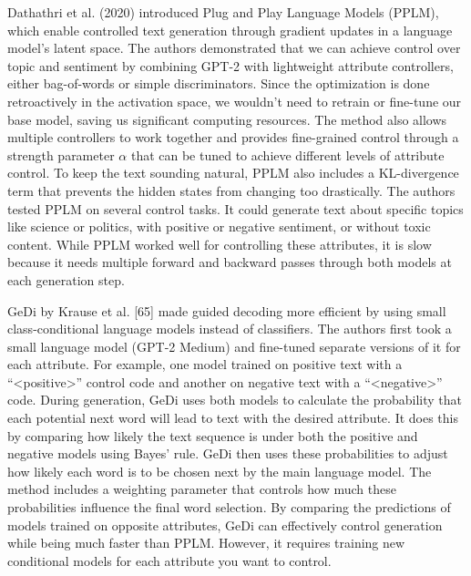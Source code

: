 Dathathri et al. (2020) introduced Plug and Play Language Models (PPLM), which enable controlled text generation through gradient updates in a language model's latent space. 
The authors demonstrated that we can achieve control over topic and sentiment by combining GPT-2 with lightweight attribute controllers, either bag-of-words or simple discriminators. 
Since the optimization is done retroactively in the activation space, we wouldn't need to retrain or fine-tune our base model, saving us significant computing resources. 
The method also allows multiple controllers to work together and provides fine-grained control through a strength parameter $\alpha$ that can be tuned to achieve different levels of attribute control.
To keep the text sounding natural, PPLM also includes a KL-divergence term that prevents the hidden states from changing too drastically. 
The authors tested PPLM on several control tasks. It could generate text about specific topics like science or politics, with positive or negative sentiment, or without toxic content. 
While PPLM worked well for controlling these attributes, it is slow because it needs multiple forward and backward passes through both models at each generation step.

GeDi by Krause et al. [65] made guided decoding more efficient by using small class-conditional language models instead of classifiers. 
The authors first took a small language model (GPT-2 Medium) and fine-tuned separate versions of it for each attribute.
For example, one model trained on positive text with a ``<positive>'' control code and another on negative text with a ``<negative>'' code. 
During generation, GeDi uses both models to calculate the probability that each potential next word will lead to text with the desired attribute. 
It does this by comparing how likely the text sequence is under both the positive and negative models using Bayes' rule. 
GeDi then uses these probabilities to adjust how likely each word is to be chosen next by the main language model. 
The method includes a weighting parameter that controls how much these probabilities influence the final word selection. 
By comparing the predictions of models trained on opposite attributes, GeDi can effectively control generation while being much faster than PPLM. 
However, it requires training new conditional models for each attribute you want to control.

